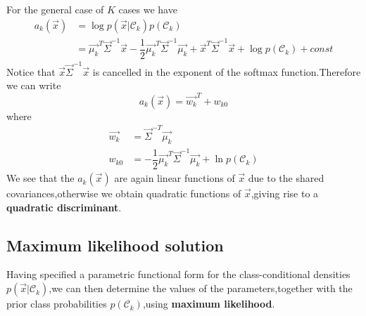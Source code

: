 For the general case of $K$ cases we have
\begin{align}
a_k(\vec{x}) &= \log p(\vec{x}|\mathcal{C}_k)p(\mathcal{C}_k)  \\
&=\vec{\mu_k}^T\vec{\Sigma}^{-1}\vec{x} - \dfrac{1}{2}{\vec{\mu_k}}^T\vec{\Sigma}^{-1}\vec{\mu_k} + \vec{x}^T\vec{\Sigma}^{-1}\vec{x}+
 \log p(\mathcal{C}_k) + const
\end{align}
Notice that $\vec{x}\vec{\Sigma}^{-1}\vec{x}$ is cancelled in the exponent of the softmax function.Therefore we can write
\begin{equation}
a_k(\vec{x}) = \vec{w_k}^T+w_{k0}
\end{equation}
where
\begin{align}
\vec{w_k} &= \vec{\Sigma}^{-T}\vec{\mu_k} \\
w_{k0} &= -\dfrac{1}{2}\vec{\mu_k}^T\vec{\Sigma}^{-1}\vec{\mu_k} + \ln p(\mathcal{C}_k)
\end{align}
We see that the $a_k(\vec{x})$ are again linear functions of $\vec{x}$ due to the shared covariances,otherwise we obtain quadratic functions of $\vec{x}$,giving rise to a \textbf{quadratic discriminant}.

\subsection{Maximum likelihood solution}
Having specified a parametric functional form for the class-conditional densities $p(\vec{x}|\mathcal{C}_k)$,we can then determine the values of the parameters,together with the prior class probabilities $p(\mathcal{C}_k)$,using \textbf{maximum likelihood}.

